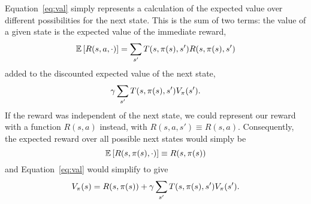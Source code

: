 \documentclass[a4paper]{article}
\begin{document}
Equation~\ref{eq:val} simply represents a calculation of the expected value
over different possibilities for the next state.
This is the sum of two terms:
the value of a given state is the expected value of the immediate reward,
\begin{equation} \label{eq:e_rew}
  \mathbb{E} \left[{R(s, a, \cdot)}\right] = \sum_{s'} T(s, \pi(s), s') R(s, \pi(s), s')
\end{equation}
added to the discounted expected value of the next state,
\begin{equation}
  \gamma \sum_{s'} T(s, \pi(s), s') V_\pi(s') .
\end{equation}
If the reward was independent of the next state, we could represent
our reward with a function $R(s, a)$ instead,
with $R(s, a, s') \equiv R(s, a)$.
Consequently, the expected reward over all possible next states
would simply be
\begin{equation*}
  \mathbb{E} \left[{R(s, \pi(s), \cdot)}\right] \equiv R(s, \pi(s))
\end{equation*}
and Equation~\ref{eq:val} would
simplify to give
\begin{equation} \label{eq:val_rsa}
  V_\pi(s) = R(s, \pi(s)) + \gamma \sum_{s'} T(s, \pi(s), s') V_\pi(s') .
\end{equation}
\end{document}
